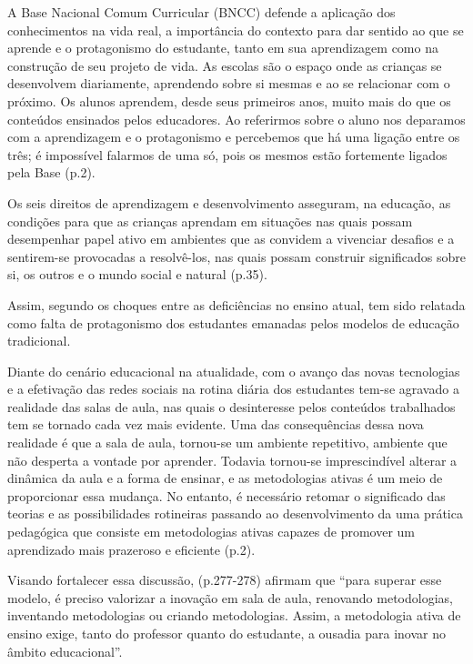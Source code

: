A Base Nacional Comum Curricular (BNCC) defende a aplicação dos conhecimentos na vida real, a importância do contexto para dar sentido ao que se aprende e o protagonismo do estudante, tanto em sua aprendizagem como na construção de seu projeto de vida. As escolas são o espaço onde as crianças se desenvolvem diariamente, aprendendo sobre si mesmas e ao se relacionar com o próximo. Os alunos aprendem, desde seus primeiros anos, muito mais do que os conteúdos ensinados pelos educadores. Ao referirmos sobre o aluno nos deparamos com a aprendizagem e o protagonismo e percebemos que há uma ligação entre os três; é impossível falarmos de uma só, pois os mesmos estão fortemente ligados pela Base \cite{FRANCESCONI2019} (p.2).

\begin{citacao}
    Os seis direitos de aprendizagem e desenvolvimento asseguram, na educação, as condições para que as crianças aprendam em situações nas quais possam desempenhar papel ativo em ambientes que as convidem a vivenciar desafios e a sentirem-se provocadas a resolvê-los, nas quais possam construir significados sobre si, os outros e o mundo social e natural \cite{Educacao.SecretariadeEducacaoFundamental2017} (p.35).
\end{citacao}

Assim, segundo  os choques entre as deficiências no ensino atual, tem sido relatada como falta de protagonismo dos estudantes emanadas pelos modelos de educação tradicional.

Diante do cenário educacional na atualidade, com o avanço das novas tecnologias e a efetivação das redes sociais na rotina diária dos estudantes tem-se agravado a realidade das salas de aula, nas quais o desinteresse pelos conteúdos trabalhados tem se tornado cada vez mais evidente. Uma das consequências dessa nova realidade é que a sala de aula, tornou-se um ambiente repetitivo, ambiente que não desperta a vontade por aprender. Todavia tornou-se imprescindível alterar a dinâmica da aula e a forma de ensinar, e as metodologias ativas é um meio de proporcionar essa mudança. No entanto, é necessário retomar o significado das teorias e as possibilidades rotineiras passando ao desenvolvimento da uma prática pedagógica que consiste em metodologias ativas capazes de promover um aprendizado mais prazeroso e eficiente \cite{DUMONT2016} (p.2).

Visando fortalecer essa discussão,  (p.277-278) afirmam que ``para superar esse modelo, é preciso valorizar a inovação em sala de aula, renovando metodologias, inventando metodologias ou criando metodologias. Assim, a metodologia ativa de ensino exige, tanto do professor quanto do estudante, a ousadia para inovar no âmbito educacional''.

